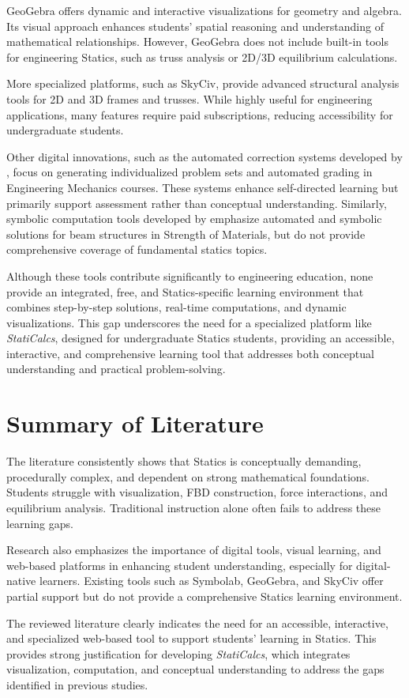GeoGebra offers dynamic and interactive visualizations for geometry and algebra. Its visual approach enhances students’ spatial reasoning and understanding of mathematical relationships. However, GeoGebra does not include built-in tools for engineering Statics, such as truss analysis or 2D/3D equilibrium calculations.

More specialized platforms, such as SkyCiv, provide advanced structural analysis tools for 2D and 3D frames and trusses. While highly useful for engineering applications, many features require paid subscriptions, reducing accessibility for undergraduate students.

Other digital innovations, such as the automated correction systems developed by \cite{gfrerer_teaching_2023}, focus on generating individualized problem sets and automated grading in Engineering Mechanics courses. These systems enhance self-directed learning but primarily support assessment rather than conceptual understanding. Similarly, symbolic computation tools developed by \cite{sollradl_symbolic_nodate} emphasize automated and symbolic solutions for beam structures in Strength of Materials, but do not provide comprehensive coverage of fundamental statics topics.

Although these tools contribute significantly to engineering education, none provide an integrated, free, and Statics-specific learning environment that combines step-by-step solutions, real-time computations, and dynamic visualizations. This gap underscores the need for a specialized platform like \textit{StatiCalcs}, designed for undergraduate Statics students, providing an accessible, interactive, and comprehensive learning tool that addresses both conceptual understanding and practical problem-solving.



\section{Summary of Literature}

The literature consistently shows that Statics is conceptually demanding, procedurally complex, and dependent on strong mathematical foundations. Students struggle with visualization, FBD construction, force interactions, and equilibrium analysis. Traditional instruction alone often fails to address these learning gaps.

Research also emphasizes the importance of digital tools, visual learning, and web-based platforms in enhancing student understanding, especially for digital-native learners. Existing tools such as Symbolab, GeoGebra, and SkyCiv offer partial support but do not provide a comprehensive Statics learning environment.

The reviewed literature clearly indicates the need for an accessible, interactive, and specialized web-based tool to support students’ learning in Statics. This provides strong justification for developing \textit{StatiCalcs}, which integrates visualization, computation, and conceptual understanding to address the gaps identified in previous studies.